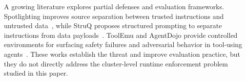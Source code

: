 A growing literature explores partial defenses and evaluation frameworks. Spotlighting improves source separation between trusted instructions and untrusted data~\cite{hines2024spotlighting}, while StruQ proposes structured prompting to separate instructions from data payloads~\cite{chen2024struq}. ToolEmu and AgentDojo provide controlled environments for surfacing safety failures and adversarial behavior in tool-using agents~\cite{ruan2023toolemu,debenedetti2024agentdojo}. These works establish the threat and improve evaluation practice, but they do not directly address the cluster-level runtime enforcement problem studied in this paper.
